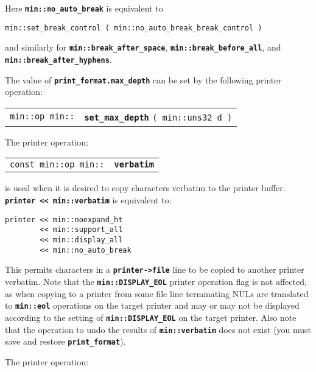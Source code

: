 \documentclass[12pt]{article}
\makeatletter
\newcommand{\TT}[1]{{\tt \bfseries #1}}
\newcommand{\ttindex}[1]{\index{#1@{\tt #1}}}
\newcommand{\EOL}{\penalty \exhyphenpenalty}
\newenvironment{indpar}[1][0.3in]%
	{\begin{list}{}%
		     {\setlength{\itemsep}{0in}%
		      \setlength{\topsep}{0in}%
		      \setlength{\parsep}{1ex}%
		      \setlength{\labelwidth}{#1}%
		      \setlength{\leftmargin}{#1}%
		      \addtolength{\leftmargin}{\labelsep}}%
	 \item}%
	{\end{list}}
\newcommand{\LABEL}[1]{\label{#1}}
\newcommand{\MINKEY}[1]%
	   {\TT{#1}\ttindex{min::#1}\ttindex{#1}}
\makeatother
\begin{document}
Here \TT{min::no\_auto\_break} is equivalent to
\begin{center}
\verb|min::set_break_control ( min::no_auto_break_break_control )|
\end{center}
and similarly for \TT{min::break\_\EOL after\_\EOL space},
\TT{min::break\_\EOL before\_\EOL all},
and \TT{min::break\_\EOL after\_\EOL hyphens}.

The value of \TT{print\_format.max\_depth} can be set by the following
printer operation:

\begin{indpar}[1em]\begin{tabular}{r@{}l}
\verb|min::op min::|
    & \MINKEY{set\_max\_depth} \verb|( min::uns32 d )|
\LABEL{MIN::SET_MAX_DEPTH} \\
\end{tabular}\end{indpar}

The printer operation:

\begin{indpar}[1em]\begin{tabular}{r@{}l}
\verb|const min::op min::| & \MINKEY{verbatim}
\LABEL{MIN::VERBATIM} \\
\end{tabular}\end{indpar}

is used when it is desired to copy characters verbatim to the
printer buffer.  \TT{printer <{}< min::\EOL verbatim} is equivalent to:

\begin{indpar}\begin{verbatim}
printer << min::noexpand_ht
        << min::support_all
        << min::display_all
        << min::no_auto_break
\end{verbatim}\end{indpar}

This permits characters in a \TT{printer->file} line to be copied
to another printer verbatim.  Note that
the \TT{min::\EOL DISPLAY\_\EOL EOL} printer operation flag
is not affected, as when copying to a printer from some file
line terminating NULs are translated to \TT{min::\EOL eol}
operations on the target printer and may or may not be
displayed according to the setting of
\TT{min::\EOL DISPLAY\_\EOL EOL} on the target printer.
Also note that the operation to undo the results
of \TT{min::\EOL verbatim} does not exist (you must save and restore
\TT{print\_\EOL format}).

The printer operation:
\end{document}
